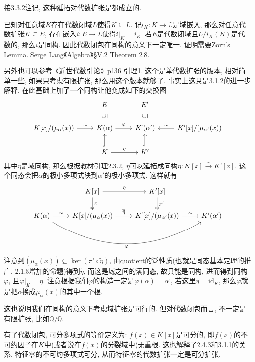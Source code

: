 \documentclass{../solutions-cn}
\begin{document}
\begin{remark}
    接3.3.2注记, 这种延拓对代数扩张是都成立的. 

    \begin{propstar}
        已知对任意域$K$存在代数闭域$L$使得$K \subseteq L$. 记$i_K:K \to L$是域嵌入, 那么对任意代数扩张$K \subseteq E$, 存在嵌入$i:E \to L$使得$i|_K = i_K$. 若$E$是代数闭域且$L/i_K(K)$是代数的, 那么$i$是同构. 因此代数闭包在同构的意义下一定唯一. 证明需要Zorn's Lemma. Serge Lang《Algebra》\S V.2 Theorem 2.8. 
    \end{propstar}
    另外也可以参考《近世代数引论》p136 引理1, 这个是单代数扩张的版本, 相对简单一些, 如果只考虑有限扩张, 那么用这个版本就够了. 事实上这只是3.1.2的进一步解释, 在此基础上加了一个同构让他变成如下的交换图
    \[
        \begin{tikzcd}
            & E                                                              & E'                                          &                                               \\
{K[x]/(\mu_\alpha(x))} \arrow[r, "\sim"] & K(\alpha) \arrow[r, "\varphi"] \arrow[u, "\subseteq", phantom, sloped] & K'(\alpha') \arrow[u, "\subseteq", phantom, sloped] & {K'[x]/(\mu_{\alpha'}(x))} \arrow[l, "\sim"'] \\
            & K \arrow[r, "\eta"] \arrow[u, hook]                            & K' \arrow[u, hook]                          &                                              
        \end{tikzcd}
    \]
    其中$\eta$是域同构, 那么根据教材引理2.3.2, $\eta$可以延拓成同构$\tilde{\eta}:K[x] \xrightarrow{\sim} K'[x]$. 这个同态会把$\alpha$的极小多项式映到$\alpha'$的极小多项式. 这样就有
    \[
        \begin{tikzcd}
            & {K[x]} \arrow[d, "\pi", two heads] \arrow[r, "\tilde{\eta}"]       & {K'[x]} \arrow[d, "\pi'", two heads]                 &            \\
K(\alpha) \arrow[r, "\sim"] \arrow[rrr, "\varphi"', bend right] & {K[x]/(\mu_\alpha(x))} \arrow[r, "\overline{\tilde{\eta}}"] & {K'[x]/(\mu_{\alpha'}(x))} \arrow[r, "\sim"] & K'(\alpha')
        \end{tikzcd}
    \]
    注意到$(\mu_\alpha(x)) \subseteq \ker(\pi' \circ \tilde{\eta})$, 由quotient的泛性质(也就是同态基本定理的推广, 2.1.8增加的命题)得到$\overline{\tilde{\eta}}$, 而这是域之间的满同态, 故只能是同构, 进而得到同构$\varphi$, 且$\varphi|_K = \eta$. 注意根据我们$\varphi$的构造一定是$\varphi(\alpha) = \alpha'$, 若这里$\eta = \mathrm{id}_K$, 那么$\varphi$就是把$\alpha$换成$\mu_\alpha(x)$的其中一个根.

    这也说明我们在同构的意义下考虑域扩张是可行的. 但对代数闭包而言, 不一定是有限扩张, 比如$\overline{\mathbb{Q}}/\mathbb{Q}$.

    有了代数闭包, 可分多项式的等价定义为: $f(x) \in K[x]$是可分的, 即$f(x)$的不可约因子在$\overline{K}$中(或者说在$f(x)$的分裂域中)无重根. 这也解释了2.4.3和3.1.1的关系, 特征零的不可约多项式可分, 从而特征零的代数扩张一定是可分扩张.
\end{remark}
\end{document}
